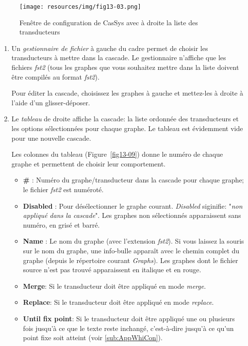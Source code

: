 \begin{figure}[!htb]
  \centering
  \texttt{[image: resources/img/fig13-03.png]}
  \caption{Fenêtre de configuration de CasSys avec à droite la liste des transducteurs}
  \label{fig13-03}
\end{figure}

\begin{enumerate}
	\item Un \textit{gestionnaire de fichier} à gauche du cadre permet de choisir les transducteurs à mettre dans la cascade.
	Le gestionnaire n'affiche que les fichiers \emph{fst2} (tous les graphes que vous souhaitez mettre dans la liste doivent être compilés au format \textit{fst2}).
	
	Pour éditer la cascade, choisissez les graphes à gauche et mettez-les à droite à l'aide d'un glisser-déposer.
\item Le \textit{tableau} de droite affiche la cascade: la liste ordonnée des transducteurs et les options sélectionnées pour chaque graphe.
		Le tableau est évidemment vide pour une nouvelle cascade.
		 
		Les colonnes du tableau (Figure~\ref{fig13-09}) donne le numéro de chaque graphe et permettent de choisir leur comportement.
	\begin{itemize}
	\item \textbf{\#} : Numéro du graphe/transducteur dans la cascade pour chaque graphe; le fichier \emph{fst2} est numéroté.
	\item \textbf{Disabled} : Pour désélectionner le graphe courant. \textit{Disabled} siginifie: "\textit{non appliqué dans la cascade}".
		Les graphes non sélectionnés apparaissent sans numéro, en grisé et barré.
	\item \textbf{Name} : Le nom du graphe (avec l'extension \emph{fst2}). Si vous laissez la souris sur le nom du graphe,
		une info-bulle apparaît avec le chemin complet du graphe (depuis le répertoire courant \emph{Graphs}).
		Les graphes dont le fichier source n'est pas trouvé apparaissent en italique et en rouge.

	\item \textbf{Merge}: Si le transducteur doit être appliqué en mode \textit{merge}.
	\item \textbf{Replace}: Si le transducteur doit être appliqué en mode \textit{replace}.
	\item \textbf{Until fix point}: Si le transducteur doit être appliqué une ou plusieurs fois
		jusqu'à ce que le texte reste inchangé, c'est-à-dire jusqu'à ce qu'un point fixe soit atteint (voir \ref{sub:AppWhiCon}).
	\end{itemize}
	

\end{enumerate}
